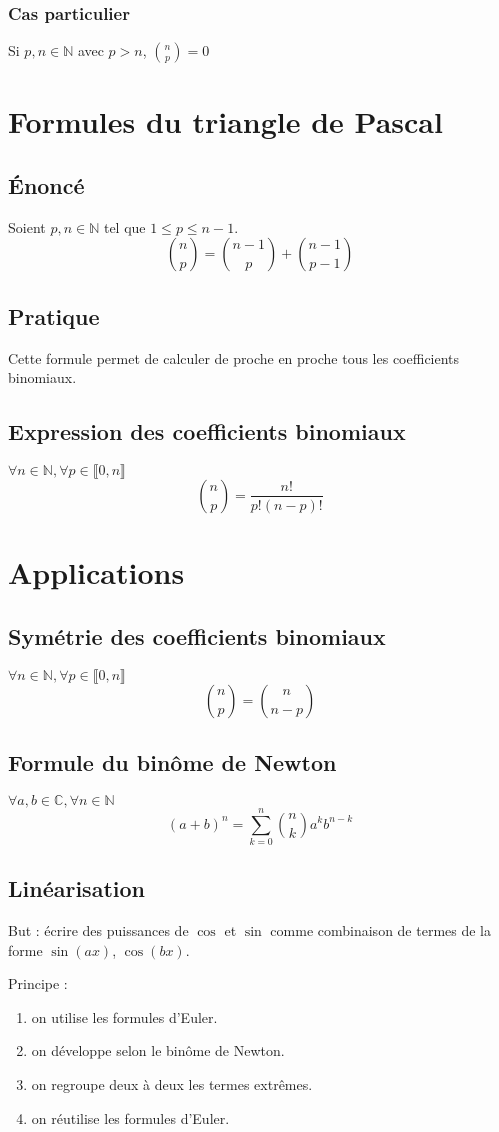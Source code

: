 \documentclass[12pt,a4paper,french]{book}
\begin{document}
			\subsubsection{Cas particulier}
			Si $p,n \in \mathbb{N}$ avec $p>n$, $\binom{n}{p} = 0$
	\section{Formules du triangle de Pascal}
		\subsection{Énoncé}
		Soient $p,n \in \mathbb{N}$ tel que $1 \leqslant p \leqslant n-1$.
		\[\binom{n}{p} = \binom{n-1}{p} + \binom{n-1}{p-1}\]
		\subsection{Pratique}
		Cette formule permet de calculer de proche en proche tous les coefficients binomiaux.
		\subsection{Expression des coefficients binomiaux}
		$\forall n \in \mathbb{N}, \forall p \in \llbracket 0,n \rrbracket$
		\[\binom{n}{p} = \frac{n!}{p!(n-p)!}\]
	\section{Applications}
		\subsection{Symétrie des coefficients binomiaux}
		$\forall n \in \mathbb{N}, \forall p \in \llbracket 0,n \rrbracket$
		\[\binom{n}{p} = \binom{n}{n-p}\]
		\subsection{Formule du binôme de Newton}
		$\forall a,b \in \mathbb{C}, \forall n \in \mathbb{N}$
		\[(a+b)^n = \sum_{k=0}^{n}\binom{n}{k} a^k b^{n-k}\]
		\subsection{Linéarisation}
			But : écrire des puissances de $\cos$ et $\sin$ comme combinaison de termes de la forme $\sin(ax)$, $\cos(bx)$.
			
			Principe : \begin{enumerate}
				\item on utilise les formules d'Euler.
				\item on développe selon le binôme de Newton.
				\item on regroupe deux à deux les termes extrêmes.
				\item on réutilise les formules d'Euler.
			\end{enumerate}
\end{document}
